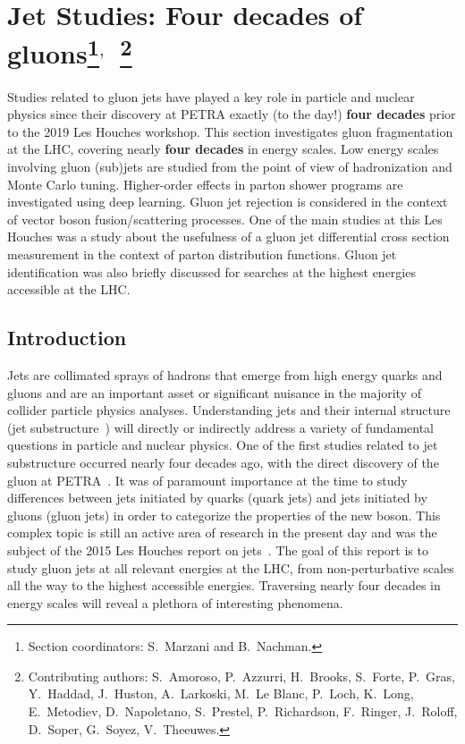 \documentclass[11pt]{cernrep}
\begin{document}
\section{Jet Studies: Four decades of gluons\protect\footnote{Section coordinators: S.~Marzani and B.~Nachman.}$^{,}$~\protect\footnote{Contributing authors: S.~Amoroso, P.~Azzurri, H.~Brooks, S.~Forte, P.~Gras, Y.~Haddad, J.~Huston, A.~Larkoski, M.~Le Blanc, P.~Loch, K.~Long, E.~Metodiev, D.~Napoletano, S.~Prestel, P.~Richardson, F.~Ringer, J.~Roloff, D.~Soper, G.~Soyez, V.~Theeuwes.}}

Studies related to gluon jets have played a key role in particle and nuclear physics since their discovery at PETRA exactly (to the day!) \textbf{four decades} prior to the 2019 Les Houches workshop.  This section investigates gluon fragmentation at the LHC, covering nearly \textbf{four decades} in energy scales.  Low energy scales involving gluon (sub)jets are studied from the point of view of hadronization and Monte Carlo tuning.  Higher-order effects in parton shower programs are investigated using deep learning.  Gluon jet rejection is considered in the context of vector boson fusion/scattering processes.  One of the main studies at this Les Houches was a study about the usefulness of a gluon jet differential cross section measurement in the context of parton distribution functions.  Gluon jet identification was also briefly discussed for searches at the highest energies accessible at the LHC.

\subsection{Introduction}
\label{sec:jets:intro}

Jets are collimated sprays of hadrons that emerge from high energy quarks and gluons and are an important asset or significant nuisance in the majority of collider particle physics analyses.  Understanding jets and their internal structure (jet substructure~\cite{Abdesselam:2010pt,Altheimer:2012mn,Altheimer:2013yza,Adams:2015hiv,Asquith:2018igt,Larkoski:2017jix,Marzani:2019hun}) will directly or indirectly address a variety of fundamental questions in particle and nuclear physics.  One of the first studies related to jet substructure occurred nearly four decades ago, with the direct discovery of the gluon at PETRA~\cite{Brandelik:1979bd,Barber:1979yr,Berger:1979cj,Bartel:1979ut,Ellis:2014rma}.  It was of paramount importance at the time to study differences between jets initiated by quarks (quark jets) and jets initiated by gluons (gluon jets) in order to categorize the properties of the new boson.  This complex topic is still an active area of research in the present day and was the subject of the 2015 Les Houches report on jets~\cite{Badger:2016bpw,Gras:2017jty}.   The goal of this report is to study gluon jets at all relevant energies at the LHC, from non-perturbative scales all the way to the highest accessible energies.   Traversing nearly four decades in energy scales will reveal a plethora of interesting phenomena.  
\end{document}
